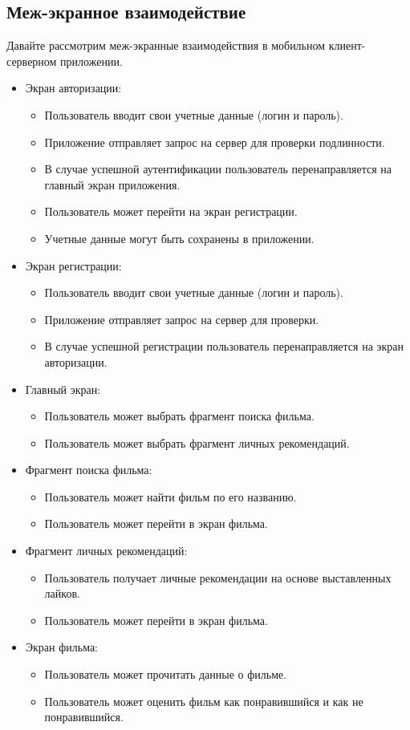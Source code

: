 \subsection{Меж-экранное взаимодействие}
Давайте рассмотрим меж-экранные взаимодействия в мобильном клиент-серверном приложении.
\begin{itemize}
	\item Экран авторизации:
	\begin{itemize}
		\item Пользователь вводит свои учетные данные (логин и пароль).
		\item Приложение отправляет запрос на сервер
		для проверки подлинности.
		\item В случае успешной аутентификации пользователь
		перенаправляется на главный экран приложения.
		\item Пользователь может перейти на экран регистрации.
		\item Учетные данные могут быть сохранены в приложении.
	\end{itemize}
	\item Экран регистрации:
	\begin{itemize}
		\item Пользователь вводит свои учетные данные (логин и пароль).
		\item Приложение отправляет запрос на сервер
		для проверки.
		\item В случае успешной регистрации пользователь
		перенаправляется на экран авторизации.
	\end{itemize}
	\item Главный экран:
	\begin{itemize}
		\item Пользователь может выбрать фрагмент поиска фильма.
		\item Пользователь может выбрать фрагмент личных рекомендаций.
	\end{itemize}
	\item Фрагмент поиска фильма:
	\begin{itemize}
		\item Пользователь может найти фильм по его названию.
		\item Пользователь может перейти в экран фильма.
	\end{itemize}
	\item Фрагмент личных рекомендаций:
	\begin{itemize}
		\item Пользователь получает личные рекомендации на основе выставленных лайков.
		\item Пользователь может перейти в экран фильма.
	\end{itemize}
	\item Экран фильма:
	\begin{itemize}
		\item Пользователь может прочитать данные о фильме.
		\item Пользователь может оценить фильм как понравившийся и как не понравившийся.
	\end{itemize}
\end{itemize}

